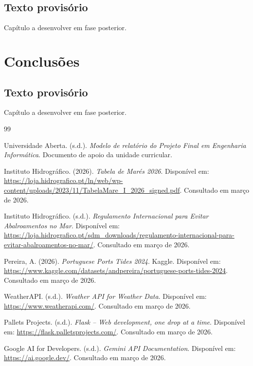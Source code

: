 \documentclass[a4paper,12pt]{report}
\begin{document}
\section*{Texto provisório}
Capítulo a desenvolver em fase posterior.

\chapter{Conclusões}
\section*{Texto provisório}
Capítulo a desenvolver em fase posterior.

\begin{thebibliography}{99}

Universidade Aberta. (s.d.). \textit{Modelo de relatório do Projeto Final em Engenharia Informática}. Documento de apoio da unidade curricular.

Instituto Hidrográfico. (2026). \textit{Tabela de Marés 2026}. Disponível em: \url{https://loja.hidrografico.pt/ln/web/wp-content/uploads/2023/11/TabelaMare_I_2026_signed.pdf}. Consultado em março de 2026.

Instituto Hidrográfico. (s.d.). \textit{Regulamento Internacional para Evitar Abalroamentos no Mar}. Disponível em: \url{https://loja.hidrografico.pt/sdm_downloads/regulamento-internacional-para-evitar-abalroamentos-no-mar/}. Consultado em março de 2026.

Pereira, A. (2026). \textit{Portuguese Ports Tides 2024}. Kaggle. Disponível em: \url{https://www.kaggle.com/datasets/andpereira/portuguese-ports-tides-2024}. Consultado em março de 2026.

WeatherAPI. (s.d.). \textit{Weather API for Weather Data}. Disponível em: \url{https://www.weatherapi.com/}. Consultado em março de 2026.

Pallets Projects. (s.d.). \textit{Flask -- Web development, one drop at a time}. Disponível em: \url{https://flask.palletsprojects.com/}. Consultado em março de 2026.

Google AI for Developers. (s.d.). \textit{Gemini API Documentation}. Disponível em: \url{https://ai.google.dev/}. Consultado em março de 2026.


\end{thebibliography}
\end{document}
